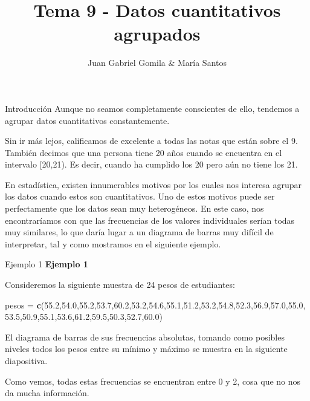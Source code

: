 \documentclass[
  ignorenonframetext,
]{beamer}
\title{Tema 9 - Datos cuantitativos agrupados}
\author{Juan Gabriel Gomila \& María Santos}
\date{}
\newenvironment{Shaded}{\begin{snugshade}}{\end{snugshade}}
\newcommand{\FloatTok}[1]{\textcolor[rgb]{0.00,0.00,0.81}{#1}}
\newcommand{\KeywordTok}[1]{\textcolor[rgb]{0.13,0.29,0.53}{\textbf{#1}}}
\newcommand{\NormalTok}[1]{#1}
\newcommand{\StringTok}[1]{\textcolor[rgb]{0.31,0.60,0.02}{#1}}
\begin{document}
\frame{\titlepage}

\begin{frame}{Introducción}
\protect\hypertarget{introducciuxf3n}{}
Aunque no seamos completamente conscientes de ello, tendemos a agrupar
datos cuantitativos constantemente.

Sin ir más lejos, calificamos de excelente a todas las notas que están
sobre el 9. También decimos que una persona tiene 20 años cuando se
encuentra en el intervalo {[}20,21). Es decir, cuando ha cumplido los 20
pero aún no tiene los 21.

En estadística, existen innumerables motivos por los cuales nos interesa
agrupar los datos cuando estos son cuantitativos. Uno de estos motivos
puede ser perfectamente que los datos sean muy heterogéneos. En este
caso, nos encontraríamos con que las frecuencias de los valores
individuales serían todas muy similares, lo que daría lugar a un
diagrama de barras muy difícil de interpretar, tal y como mostramos en
el siguiente ejemplo.
\end{frame}

\begin{frame}[fragile]{Ejemplo 1}
\protect\hypertarget{ejemplo-1}{}
\textbf{Ejemplo 1}

Consideremos la siguiente muestra de 24 pesos de estudiantes:

\begin{Shaded}
\begin{Highlighting}[]
\NormalTok{pesos =}\StringTok{ }\KeywordTok{c}\NormalTok{(}\FloatTok{55.2}\NormalTok{,}\FloatTok{54.0}\NormalTok{,}\FloatTok{55.2}\NormalTok{,}\FloatTok{53.7}\NormalTok{,}\FloatTok{60.2}\NormalTok{,}\FloatTok{53.2}\NormalTok{,}\FloatTok{54.6}\NormalTok{,}\FloatTok{55.1}\NormalTok{,}\FloatTok{51.2}\NormalTok{,}\FloatTok{53.2}\NormalTok{,}\FloatTok{54.8}\NormalTok{,}\FloatTok{52.3}\NormalTok{,}\FloatTok{56.9}\NormalTok{,}\FloatTok{57.0}\NormalTok{,}\FloatTok{55.0}\NormalTok{,}
          \FloatTok{53.5}\NormalTok{,}\FloatTok{50.9}\NormalTok{,}\FloatTok{55.1}\NormalTok{,}\FloatTok{53.6}\NormalTok{,}\FloatTok{61.2}\NormalTok{,}\FloatTok{59.5}\NormalTok{,}\FloatTok{50.3}\NormalTok{,}\FloatTok{52.7}\NormalTok{,}\FloatTok{60.0}\NormalTok{)}
\end{Highlighting}
\end{Shaded}

El diagrama de barras de sus frecuencias absolutas, tomando como
posibles niveles todos los pesos entre su mínimo y máximo se muestra en
la siguiente diapositiva.

Como vemos, todas estas frecuencias se encuentran entre 0 y 2, cosa que
no nos da mucha información.
\end{frame}
\end{document}
